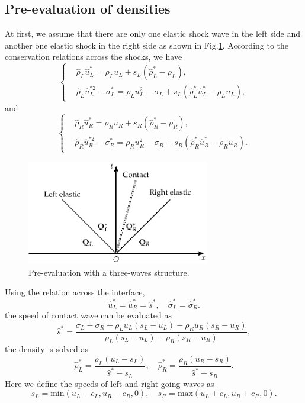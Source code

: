 \documentclass[review]{elsarticle}
\begin{document}
\begin{enumerate}[Step 1]
\subsection{Pre-evaluation of densities}\label{sec:eva}
At first, we assume that there are only one elastic shock wave in the left side and another one  elastic shock in the right side as shown in Fig.\ref{fig:HLLC}. According to the conservation relations across the shocks, we have    
\begin{equation}
  \left\{
  \begin{aligned}
	&\hat{\rho}_L\hat{u}^*_L = \rho_L u_L +s_L(\hat{\rho}_L^*-\rho_L), \\
	&\hat{\rho}_L\hat{u}_L^{*2}-\sigma_L^* = \rho_L u_L^2 -\sigma_L +s_L(\hat{\rho}_L^* \hat{u}_L^*-\rho_L u_L), 
  \end{aligned}
\right.
\end{equation}
and
\begin{equation}
  \left\{
  \begin{aligned}
	&\hat{\rho}_R\hat{u}^*_R = \rho_R u_R +s_R(\hat{\rho}_R^*-\rho_R), \\
	&\hat{\rho}_R\hat{u}_R^{*2}-\sigma_R^* = \rho_R u_R^2 -\sigma_R +s_R(\hat{\rho}_R^* \hat{u}_R^*-\rho_R u_R). 
  \end{aligned}
\right.
\end{equation}
\begin{figure}
  \centering
  \includegraphics[width=8cm]{Tikz-figure7.eps}
  \caption{Pre-evaluation with a three-waves structure.}
  \label{fig:HLLC}
\end{figure}


Using the relation across the interface,
\begin{equation}
  \hat{u}_L^* = \hat{u}_R^* =\hat{s}^*,\quad \hat{\sigma}_L^* = \hat{\sigma}_R^*.
\end{equation}
the speed of contact wave can be evaluated as 
\begin{equation}
\hat{s}^* = \frac{\sigma_L-\sigma_R+\rho_L u_L(s_L-u_L)-\rho_R u_R(s_R-u_R)}{\rho_L(s_L-u_L)-\rho_R(s_R-u_R)},
\end{equation}
the density is solved as 
\begin{equation}
\hat{\rho}_L^* = \frac{\rho_L(u_L-s_L)}{\hat{s}^*-s_L}, \quad
\hat{\rho}_R^* = \frac{\rho_R(u_R-s_R)}{\hat{s}^*-s_R}.
\end{equation}
Here we define the speeds of left and right going waves as
 \begin{equation}
      s_L = \text{min} (u_L-c_L, u_R-c_R, 0),  \quad s_R = \text{max}(u_L+c_L, u_R+c_R, 0).
\end{equation}

\end{enumerate}
\end{document}

